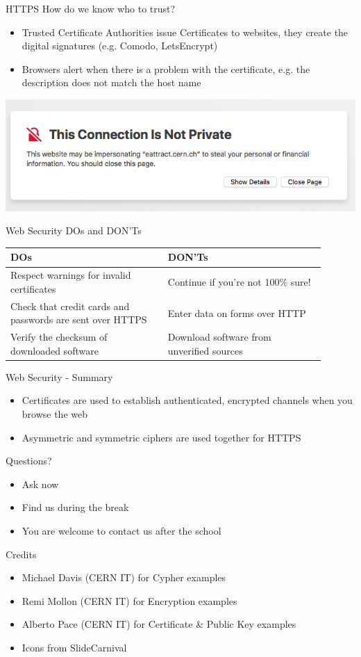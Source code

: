 \documentclass{beamer}
\begin{document}
\begin{frame}{HTTPS}
How do we know who to trust?
\begin{itemize}
\item Trusted Certificate Authorities issue Certificates to websites, they create the digital signatures (e.g. Comodo, LetsEncrypt)
\item Browsers alert when there is a problem with the certificate, e.g. the description does not match the host name
\end{itemize}
\begin{center}
\includegraphics[width=0.5\linewidth]{certificate-error.png}
\end{center}
\end{frame}

\begin{frame}{Web Security DOs and DON'Ts}
\begin{center}
\begin{tabular}{ |p{0.45\linewidth}|p{0.45\linewidth}| }
\hline
\textbf{DOs} & \textbf{DON'Ts} \\ \hline \hline
Respect warnings for invalid certificates & Continue if you're not 100\% sure!\\ \hline
Check that credit cards and passwords are sent over HTTPS & Enter data on forms over HTTP\\ \hline
Verify the checksum of downloaded software & Download software from unverified sources\\ \hline 
\end{tabular}
\end{center}
\end{frame}


\begin{frame}{Web Security - Summary}
\begin{itemize}
\item Certificates are used to establish authenticated, encrypted channels when you browse the web
\item Asymmetric and symmetric ciphers are used together for HTTPS
\end{itemize}
\end{frame}

\begin{frame}{Questions?}
\begin{itemize}
\item Ask now
\item Find us during the break
\item You are welcome to contact us after the school
\end{itemize}
\end{frame}

\begin{frame}{Credits}
	\begin{itemize}
		\item Michael Davis (CERN IT) for Cypher examples
		\item Remi Mollon (CERN IT) for Encryption examples
        \item Alberto Pace (CERN IT) for Certificate \& Public Key examples
        \item Icons from SlideCarnival
	\end{itemize}
\end{frame}

\backcover
\end{document}
